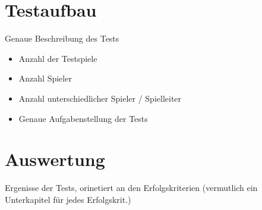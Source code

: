 \section{Testaufbau}
\label{sec:Testaufbau}
Genaue Beschreibung des Tests

\begin{itemize}
	\item Anzahl der Testspiele
	\item Anzahl Spieler
	\item Anzahl unterschiedlicher Spieler / Spielleiter
	\item Genaue Aufgabenstellung der Tests
\end{itemize}


\section{Auswertung}
\label{sec:Auswertung}
Ergenisse der Tests, orinetiert an den Erfolgskriterien (vermutlich ein Unterkapitel für jedes Erfolgskrit.)
